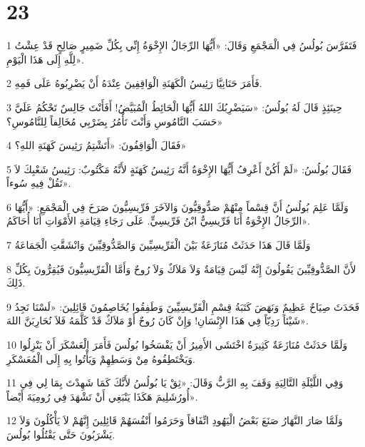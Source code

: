 \chapter{23}

\par 1 فَتَفَرَّسَ بُولُسُ فِي الْمَجْمَعِ وَقَالَ: «أَيُّهَا الرِّجَالُ الإِخْوَةُ إِنِّي بِكُلِّ ضَمِيرٍ صَالِحٍ قَدْ عِشْتُ لِلَّهِ إِلَى هَذَا الْيَوْمِ».
\par 2 فَأَمَرَ حَنَانِيَّا رَئِيسُ الْكَهَنَةِ الْوَاقِفِينَ عِنْدَهُ أَنْ يَضْرِبُوهُ عَلَى فَمِهِ.
\par 3 حِينَئِذٍ قَالَ لَهُ بُولُسُ: «سَيَضْرِبُكَ اللهُ أَيُّهَا الْحَائِطُ الْمُبَيَّضُ! أَفَأَنْتَ جَالِسٌ تَحْكُمُ عَلَيَّ حَسَبَ النَّامُوسِ وَأَنْتَ تَأْمُرُ بِضَرْبِي مُخَالِفاً لِلنَّامُوسِ؟»
\par 4 فَقَالَ الْوَاقِفُونَ: «أَتَشْتِمُ رَئِيسَ كَهَنَةِ اللهِ؟»
\par 5 فَقَالَ بُولُسُ: «لَمْ أَكُنْ أَعْرِفُ أَيُّهَا الإِخْوَةُ أَنَّهُ رَئِيسُ كَهَنَةٍ لأَنَّهُ مَكْتُوبٌ: رَئِيسُ شَعْبِكَ لاَ تَقُلْ فِيهِ سُوءاً».
\par 6 وَلَمَّا عَلِمَ بُولُسُ أَنَّ قِسْماً مِنْهُمْ صَدُّوقِيُّونَ وَالآخَرَ فَرِّيسِيُّونَ صَرَخَ فِي الْمَجْمَعِ: «أَيُّهَا الرِّجَالُ الإِخْوَةُ أَنَا فَرِّيسِيٌّ ابْنُ فَرِّيسِيٍّ. عَلَى رَجَاءِ قِيَامَةِ الأَمْوَاتِ أَنَا أُحَاكَمُ».
\par 7 وَلَمَّا قَالَ هَذَا حَدَثَتْ مُنَازَعَةٌ بَيْنَ الْفَرِّيسِيِّينَ وَالصَّدُّوقِيِّينَ وَانْشَقَّتِ الْجَمَاعَةُ
\par 8 لأَنَّ الصَّدُّوقِيِّينَ يَقُولُونَ إِنَّهُ لَيْسَ قِيَامَةٌ وَلاَ مَلاَكٌ وَلاَ رُوحٌ وَأَمَّا الْفَرِّيسِيُّونَ فَيُقِرُّونَ بِكُلِّ ذَلِكَ.
\par 9 فَحَدَثَ صِيَاحٌ عَظِيمٌ وَنَهَضَ كَتَبَةُ قِسْمِ الْفَرِّيسِيِّينَ وَطَفِقُوا يُخَاصِمُونَ قَائِلِينَ: «لَسْنَا نَجِدُ شَيْئاً رَدِيّاً فِي هَذَا الإِنْسَانِ! وَإِنْ كَانَ رُوحٌ أَوْ مَلاَكٌ قَدْ كَلَّمَهُ فَلاَ نُحَارِبَنَّ اللهَ».
\par 10 وَلَمَّا حَدَثَتْ مُنَازَعَةٌ كَثِيرَةٌ اخْتَشَى الأَمِيرُ أَنْ يَفْسَخُوا بُولُسَ فَأَمَرَ الْعَسْكَرَ أَنْ يَنْزِلُوا وَيَخْتَطِفُوهُ مِنْ وَسَطِهِمْ وَيَأْتُوا بِهِ إِلَى الْمُعَسْكَرِ.
\par 11 وَفِي اللَّيْلَةِ التَّالِيَةِ وَقَفَ بِهِ الرَّبُّ وَقَالَ: «ثِقْ يَا بُولُسُ لأَنَّكَ كَمَا شَهِدْتَ بِمَا لِي فِي أُورُشَلِيمَ هَكَذَا يَنْبَغِي أَنْ تَشْهَدَ فِي رُومِيَةَ أَيْضاً».
\par 12 وَلَمَّا صَارَ النَّهَارُ صَنَعَ بَعْضُ الْيَهُودِ اتِّفَاقاً وَحَرَمُوا أَنْفُسَهُمْ قَائِلِينَ إِنَّهُمْ لاَ يَأْكُلُونَ وَلاَ يَشْرَبُونَ حَتَّى يَقْتُلُوا بُولُسَ.
